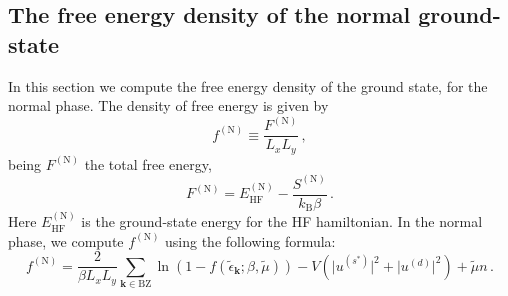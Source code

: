 \subsection{The free energy density of the normal ground-state}\label{subsec:normal-f}

In this section we compute the free energy density of the ground state, for the normal phase. The density of free energy is given by
\begin{equation}\label{eq:normal-fMFT-def}
	f^{(\mathrm{N})} \equiv \frac{F^{(\mathrm{N})}}{L_x L_y} \, ,
\end{equation}
being $F^{(\mathrm{N})}$ the total free energy,
\begin{equation}\label{eq:normal-FMFT-def}
	F^{(\mathrm{N})} = E_\mathrm{HF}^{(\mathrm{N})} - \frac{S^{(\mathrm{N})}}{k_\mathrm{B} \beta} \, .
\end{equation}
Here $E_\mathrm{HF}^{(\mathrm{N})}$ is the ground-state energy for the HF hamiltonian. In the normal phase, we compute $f^{(\mathrm{N})}$ using the following formula:
\begin{equation}\label{eq:normal-fMFT}
	f^{(\mathrm{N})} = \frac{2}{\beta L_x L_y} \sum_{\mathbf{k}\in\mathrm{BZ}} \ln \left(1-f( \tilde{\epsilon}_\mathbf{k}; \beta,\tilde{\mu})\right) - V \left( 
		\big|
			u^{(s^*)}
		\big|^2 + \big|
			u^{(d)}
		\big|^2
	\right) + \tilde{\mu} n  \, .
\end{equation}

